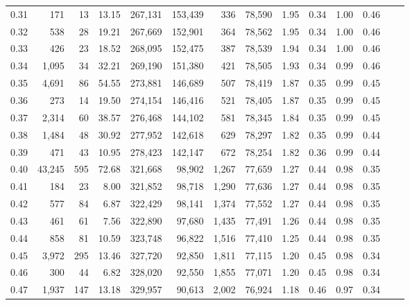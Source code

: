 \begin{tabular}{rrrrrrrrrrrrrr}
0.31 &     171 &      13 &     13.15 &  267,131 &  153,439 &     336 &  78,590 &  1.95 &  0.34 &  1.00 &      0.46 \\
0.32 &     538 &      28 &     19.21 &  267,669 &  152,901 &     364 &  78,562 &  1.95 &  0.34 &  1.00 &      0.46 \\
0.33 &     426 &      23 &     18.52 &  268,095 &  152,475 &     387 &  78,539 &  1.94 &  0.34 &  1.00 &      0.46 \\
0.34 &   1,095 &      34 &     32.21 &  269,190 &  151,380 &     421 &  78,505 &  1.93 &  0.34 &  0.99 &      0.46 \\
0.35 &   4,691 &      86 &     54.55 &  273,881 &  146,689 &     507 &  78,419 &  1.87 &  0.35 &  0.99 &      0.45 \\
0.36 &     273 &      14 &     19.50 &  274,154 &  146,416 &     521 &  78,405 &  1.87 &  0.35 &  0.99 &      0.45 \\
0.37 &   2,314 &      60 &     38.57 &  276,468 &  144,102 &     581 &  78,345 &  1.84 &  0.35 &  0.99 &      0.45 \\
0.38 &   1,484 &      48 &     30.92 &  277,952 &  142,618 &     629 &  78,297 &  1.82 &  0.35 &  0.99 &      0.44 \\
0.39 &     471 &      43 &     10.95 &  278,423 &  142,147 &     672 &  78,254 &  1.82 &  0.36 &  0.99 &      0.44 \\
0.40 &  43,245 &     595 &     72.68 &  321,668 &   98,902 &   1,267 &  77,659 &  1.27 &  0.44 &  0.98 &      0.35 \\
0.41 &     184 &      23 &      8.00 &  321,852 &   98,718 &   1,290 &  77,636 &  1.27 &  0.44 &  0.98 &      0.35 \\
0.42 &     577 &      84 &      6.87 &  322,429 &   98,141 &   1,374 &  77,552 &  1.27 &  0.44 &  0.98 &      0.35 \\
0.43 &     461 &      61 &      7.56 &  322,890 &   97,680 &   1,435 &  77,491 &  1.26 &  0.44 &  0.98 &      0.35 \\
0.44 &     858 &      81 &     10.59 &  323,748 &   96,822 &   1,516 &  77,410 &  1.25 &  0.44 &  0.98 &      0.35 \\
0.45 &   3,972 &     295 &     13.46 &  327,720 &   92,850 &   1,811 &  77,115 &  1.20 &  0.45 &  0.98 &      0.34 \\
0.46 &     300 &      44 &      6.82 &  328,020 &   92,550 &   1,855 &  77,071 &  1.20 &  0.45 &  0.98 &      0.34 \\
0.47 &   1,937 &     147 &     13.18 &  329,957 &   90,613 &   2,002 &  76,924 &  1.18 &  0.46 &  0.97 &      0.34 \\

\end{tabular}
